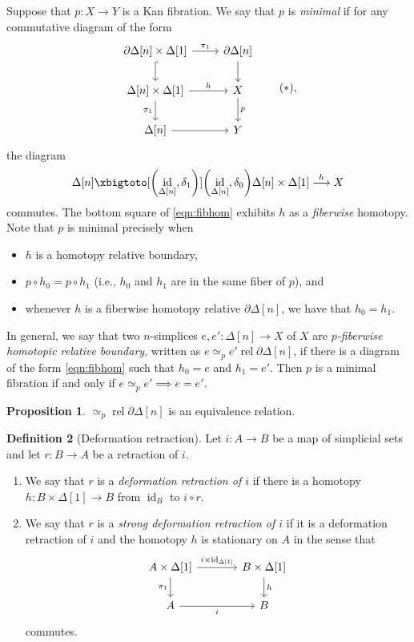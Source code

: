 \documentclass[10pt,letterpaper,cm]{nupset}
\theoremstyle{definition}
\newtheorem{definition}{Definition}[subsection]
\theoremstyle{theorem}
\newtheorem{prop}[definition]{Proposition}
\theoremstyle{remark}
\newcommand{\0}{\mathbf{0}}
\newcommand{\1}{\mathbf{1}}
\newcommand{\2}{\mathbf{2}}
\DeclareMathOperator{\idd}{id}
\DeclareMathOperator{\rel}{rel}
\newcommand{\bi}{\begin{itemize}}
\newcommand{\ei}{\end{itemize}}
\newcommand{\be}{\begin{enumerate}}
\newcommand{\ee}{\end{enumerate}}
\begin{document}
\medskip

Suppose that $p: X \to Y$ is a Kan fibration. We say that $p$ is \textit{minimal} if for any commutative diagram of the form
\[
\begin{tikzcd} \label{eqn:fibhom}
{\partial{\Delta[n]}\times \Delta[1]} \arrow[d, hook] \arrow[r, "\pi_1"] & {\partial{\Delta[n]}} \arrow[d] \\
{\Delta[n]  \times \Delta[1]} \arrow[d, "\pi_1"'] \arrow[r, "h"]   & X \arrow[d, "p"]                \\
{\Delta[n]} \arrow[r]                                              & Y                              
\end{tikzcd} \tag{$\ast$}
,\]
the diagram
\[ 
\Delta[n]  \xbigtoto[\mleft(\idd_{\Delta[n]}, \delta_1\mright)]{\mleft(\idd_{\Delta[n]}, \delta_0\mright)} \Delta[n]\times \Delta[1] \overset{h}{\longrightarrow} X
\] commutes. The bottom square of \eqref{eqn:fibhom} exhibits $h$ as a \textit{fiberwise} homotopy. Note that $p$ is minimal precisely when
\bi
\item $h$ is a homotopy relative boundary,
\item  $p\circ h_0 =p\circ h_1$ (i.e., $h_0$ and $h_1$ are in the same fiber of $p$), and
\item  whenever $h$ is a fiberwise homotopy relative $\partial{\Delta[n]}$, we have that $h_0 = h_1$.
\ei

In general, we say that two $n$-simplices $e, e' : \Delta[n] \to X$ of $X$ are \textit{$p$-fiberwise homotopic relative boundary}, written as $e \simeq_p e' \rel{\partial{\Delta[n]}}$, if there is a diagram of the form \eqref{eqn:fibhom} such that $h_0=e$ and $h_1=e'$.
Then $p$ is a minimal fibration if and only if $e \simeq_p e' \implies e=e'$.

\begin{prop}
$\simeq_p{}\rel{\partial{\Delta[n]}}$ is an equivalence relation.
\end{prop}

\smallskip


\begin{definition}[Deformation retraction]\label{defret}
Let $i: A \to B$ be a map of simplicial sets and let $r: B \to A$ be a retraction of $i$.
\be
\item We say that $r$ is a \textit{deformation retraction of $i$} if there is a homotopy $h: B \times \Delta[1] \to B$ from $\idd_B$ to $i \circ r$.
\pagebreak
\item We say that $r$ is a \textit{strong deformation retraction of $i$} if it is a deformation retraction of $i$ and the homotopy $h$ is stationary on $A$ in the sense that 
\[
\begin{tikzcd}[column sep=large]
{A\times \Delta[1]} \arrow[r, "{i\times \idd_{\Delta[1]}}"] \arrow[d, "\pi_1"'] & {B\times \Delta[1]} \arrow[d, "h"] \\
A \arrow[r, "i"']                                                               & B                                 
\end{tikzcd}
\] commutes.
\ee
\end{definition}
\end{document}
